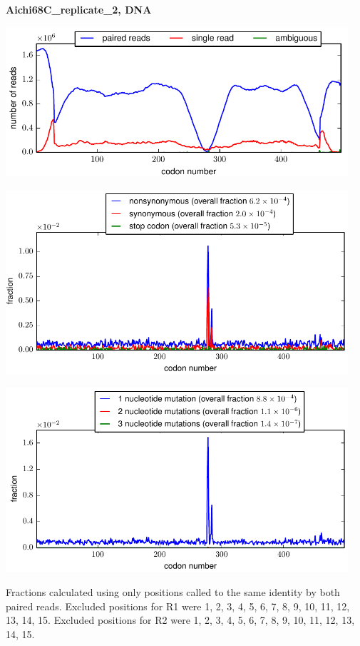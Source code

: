 \documentclass[10pt,letterpaper]{article}
\begin{document}
\centerline{\Large \bf Aichi68C\_replicate\_2, DNA}
\vspace{0.1in}

\centerline{\includegraphics[width=5in]{Aichi68C_replicate_2_DNA_codondepth.pdf}}
\vspace{0.1in}

\centerline{\includegraphics[width=5in]{Aichi68C_replicate_2_DNA_syn-ns-dist.pdf}}
\vspace{0.1in}

\centerline{\includegraphics[width=5in]{Aichi68C_replicate_2_DNA_nmutspercodon-dist.pdf}}
\vspace{0.1in}

Fractions calculated using only positions called to the same identity by both paired reads.  Excluded positions for R1 were 1, 2, 3, 4, 5, 6, 7, 8, 9, 10, 11, 12, 13, 14, 15. 
 Excluded positions for R2 were 1, 2, 3, 4, 5, 6, 7, 8, 9, 10, 11, 12, 13, 14, 15. 
\end{document}
